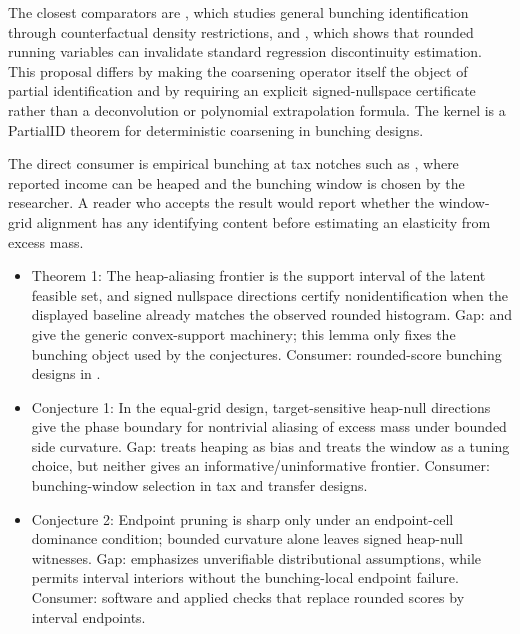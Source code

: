 \documentclass[11pt]{article}
\theoremstyle{definition}
\theoremstyle{plain}
\theoremstyle{remark}
\begin{document}
The closest comparators are \citet[Sec. 2--3]{Song2024GeneralBunching}, which studies general bunching identification through counterfactual density restrictions, and \citet[Sec. 2]{Dong2015RoundingRD}, which shows that rounded running variables can invalidate standard regression discontinuity estimation. This proposal differs by making the coarsening operator itself the object of partial identification and by requiring an explicit signed-nullspace certificate rather than a deconvolution or polynomial extrapolation formula. The kernel is a PartialID theorem for deterministic coarsening in bunching designs.

The direct consumer is empirical bunching at tax notches such as \citet{KlevenWaseem2013Notches}, where reported income can be heaped and the bunching window is chosen by the researcher. A reader who accepts the result would report whether the window-grid alignment has any identifying content before estimating an elasticity from excess mass.

\begin{itemize}[leftmargin=*]
\item Theorem 1: The heap-aliasing frontier is the support interval of the latent feasible set, and signed nullspace directions certify nonidentification when the displayed baseline already matches the observed rounded histogram. Gap: \citet{ManskiTamer2002IntervalData} and \citet{BeresteanuMolchanovMolinari2011ConvexMoment} give the generic convex-support machinery; this lemma only fixes the bunching object used by the conjectures. Consumer: rounded-score bunching designs in \citet{KlevenWaseem2013Notches}.
\item Conjecture 1: In the equal-grid design, target-sensitive heap-null directions give the phase boundary for nontrivial aliasing of excess mass under bounded side curvature. Gap: \citet[p. 268]{BarrecaLindoWaddell2016HeapingRD} treats heaping as bias and \citet[pp. 951--979, Sec. 2]{BoschDekkerStrohmaier2020Window} treats the window as a tuning choice, but neither gives an informative/uninformative frontier. Consumer: bunching-window selection in tax and transfer designs.
\item Conjecture 2: Endpoint pruning is sharp only under an endpoint-cell dominance condition; bounded curvature alone leaves signed heap-null witnesses. Gap: \citet{BertanhaMcCallumPayneSeegert2022Stata} emphasizes unverifiable distributional assumptions, while \citet{ManskiTamer2002IntervalData} permits interval interiors without the bunching-local endpoint failure. Consumer: software and applied checks that replace rounded scores by interval endpoints.
\end{itemize}
\end{document}
